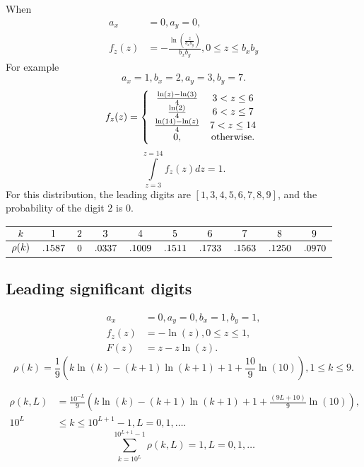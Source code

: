 \documentclass[titlepage,fleqn]{article}%
\begin{document}
When%
\begin{align*}
a_{x}  &  =0,a_{y}=0,\\
f_{z}(z)  &  =-\frac{\ln\left(  \frac{z}{b_{x}b_{y}}\right)  }{b_{x}b_{y}%
},0\leq z\leq b_{x}b_{y}%
\end{align*}
For example%
\[
a_{x}=1,b_{x}=2,a_{y}=3,b_{y}=7.
\]%
\[
f_{z}(z)=\left\{
\begin{array}
[c]{cc}%
\frac{\ln\left(  z\right)  -\ln\left(  3\right)  }{4} & 3<z\leq6\\
\frac{\ln(2)}{4} & 6<z\leq7\\
\frac{\ln(14)-\ln\left(  z\right)  }{4} & 7<z\leq14\\
0, & \text{otherwise.}%
\end{array}
\right.
\]%
\[%
{\displaystyle\int\limits_{z=3}^{z=14}}
f_{z}(z)dz=1.
\]
For this distribution, the leading digits are $[1,3,4,5,6,7,8,9]$, and the
probability of the digit $2$ is $0$.

\bigskip%

\begin{tabular}
[c]{|c|c|c|c|c|c|c|c|c|c|}\hline\hline
${\small k}$ & ${\small 1}$ & ${\small 2}$ & ${\small 3}$ & ${\small 4}$ &
${\small 5}$ & ${\small 6}$ & ${\small 7}$ & ${\small 8}$ & ${\small 9}%
$\\\hline
${\small \rho(k)}$ & ${\small .1587}$ & ${\small 0}$ & ${\small .0337}$ &
${\small .1009}$ & ${\small .1511}$ & ${\small .1733}$ & ${\small .1563}$ &
${\small .1250}$ & ${\small .0970}$\\\hline\hline
\end{tabular}


\subsection{Leading significant digits}%

\label{P2RNUDLSD}%
%

\begin{align*}
a_{x}  &  =0,a_{y}=0,b_{x}=1,b_{y}=1,\\
f_{z}(z)  &  =-\ln\left(  z\right)  ,0\leq z\leq1,\\
F(z)  &  =z-z\ln\left(  z\right)  .
\end{align*}%
\[
\rho(k)=\frac{1}{9}\left(  k\ln(k)-(k+1)\ln(k+1)+1+\frac{10}{9}\ln(10)\right)
,1\leq k\leq9.
\]
%

\begin{align*}
\rho(k,L)  &  =\frac{10^{-L}}{9}\left(  k\ln(k)-(k+1)\ln(k+1)+1+\frac{\left(
9L+10\right)  }{9}\ln(10)\right)  ,\\
10^{L}  &  \leq k\leq10^{L+1}-1,L=0,1,\ldots.
\end{align*}%
\[%
{\displaystyle\sum\limits_{k=10^{L}}^{10^{L+1}-1}}
\rho(k,L)=1,L=0,1,\ldots
\]
\end{document}
